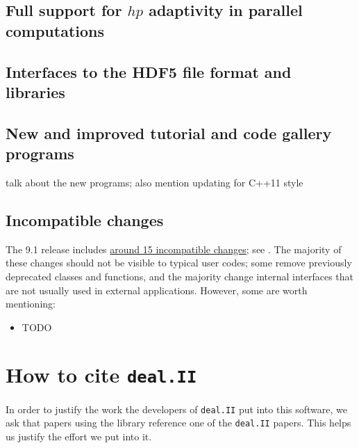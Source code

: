 \documentclass{ansarticle-preprint}
\newcommand{\specialword}[1]{\texttt{#1}}
\newcommand{\dealii}{{\specialword{deal.II}}\xspace}
\begin{document}
\subsection{Full support for $hp$ adaptivity in parallel computations}

\subsection{Interfaces to the HDF5 file format and libraries}

\subsection{New and improved tutorial and code gallery programs}

talk about the new programs; also mention updating for C++11 style


\subsection{Incompatible changes}

The 9.1 release includes
\href{https://dealii.org/developer/doxygen/deal.II/changes_between_9_0_0_and_9_1_0.html}
     {around 15 incompatible changes}; see \cite{changes91}. The majority of these changes
should not be visible to typical user codes; some remove previously
deprecated classes and functions, and the majority change internal
interfaces that are not usually used in external
applications. However, some are worth mentioning:
\begin{itemize}
\item TODO
\end{itemize}



\section{How to cite \dealii}\label{sec:cite}

In order to justify the work the developers of \dealii put into this
software, we ask that papers using the library reference one of the
\dealii papers. This helps us justify the effort we put into it.
\end{document}
